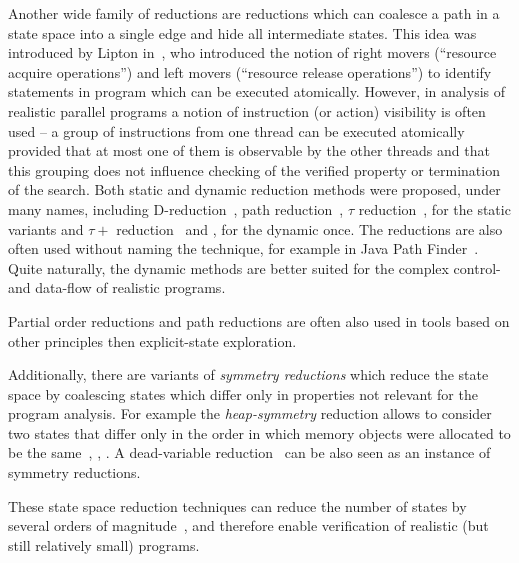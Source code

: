 Another wide family of reductions are reductions which can coalesce a path in a
state space into a single edge and hide all intermediate states.
This idea was introduced by Lipton in~\cite{Lipton1975}, who introduced the
notion of right movers (``resource acquire operations'') and left movers
(``resource release operations'') to identify statements in program which can
be executed atomically.
However, in analysis of realistic parallel programs a notion of instruction (or
action) visibility is often used -- a group of instructions from one thread can
be executed atomically provided that at most one of them is observable by the
other threads and that this grouping does not influence checking of the
verified property or termination of the search.
Both static and dynamic reduction methods were proposed, under many names,
including D-reduction~\cite{Lipton1975}, path reduction~\cite{Yorav2004}, $\tau$ reduction~\cite{BBR2012},  for the static variants and $\tau+$ reduction~\cite{RBB13} and \cite[Section 6]{RSCB2018},  for the dynamic once.
The reductions are also often used without naming the technique, for example in
Java Path Finder~\cite{Visser2003}.
Quite naturally, the dynamic methods are better suited for the complex control-
and data-flow of realistic programs.

Partial order reductions and path reductions are often also used in tools based
on other principles then explicit-state exploration.

Additionally, there are variants of \emph{symmetry reductions} which reduce the
state space by coalescing states which differ only in properties not relevant
for the program analysis.
For example the \emph{heap-symmetry} reduction allows to consider two states
that differ only in the order in which memory objects were allocated to be the
same~\cite{RBB13}, \cite[Chapter 6]{RSCB2018}, \cite{TODO}.
A dead-variable reduction~\cite{Yorav2004,Yorav2004:4,TODO} can be also seen as an instance of symmetry reductions.

These state space reduction techniques can reduce the number of states by
several orders of magnitude~\cite{TODO}, and therefore enable verification of
realistic (but still relatively small) programs.


